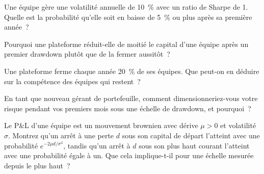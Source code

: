 \begin{interviewq}\label{iq:in:multi-manager-platforms:2}
Une équipe gère une volatilité annuelle de 10~\% avec un ratio de Sharpe de 1. Quelle est la probabilité qu'elle soit en baisse de 5~\% ou plus après
sa première année~?
\end{interviewq}

\begin{interviewq}\label{iq:in:multi-manager-platforms:3}
Pourquoi une plateforme réduit-elle de moitié le capital d'une équipe après un premier drawdown plutôt que de la fermer aussitôt~?
\end{interviewq}

\begin{interviewq}\label{iq:in:multi-manager-platforms:4}
Une plateforme ferme chaque année 20~\% de ses équipes. Que peut-on en déduire sur la compétence des équipes qui restent~?
\end{interviewq}

\begin{interviewq}\label{iq:in:multi-manager-platforms:5}
En tant que nouveau gérant de portefeuille, comment dimensionneriez-vous votre risque pendant vos premiers mois sous une échelle de drawdown, et pourquoi~?
\end{interviewq}

\begin{interviewq}\label{iq:in:multi-manager-platforms:6}
Le P\&L d'une équipe est un mouvement brownien avec dérive $\mu>0$ et volatilité $\sigma$. Montrez qu'un arrêt à une perte $d$ sous son
capital de départ l'atteint avec une probabilité $e^{-2\mu d/\sigma^2}$, tandis qu'un arrêt à $d$ sous son plus haut courant l'atteint
avec une probabilité égale à un. Que cela implique-t-il pour une échelle mesurée depuis le plus haut~?
\end{interviewq}
